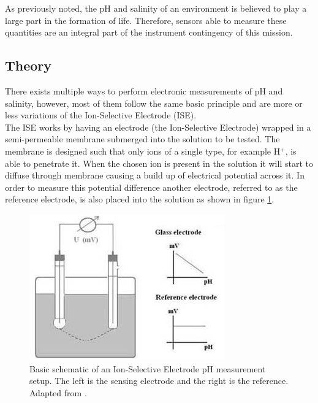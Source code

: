 
As previously noted, the pH and salinity of an environment is believed to play a large part in the formation of life. Therefore, sensors able to measure these quantities are an integral part of the instrument contingency of this mission. 

\subsection{Theory}
There exists multiple ways to perform electronic measurements of pH and salinity, however, most of them follow the same basic principle and are more or less variations of the Ion-Selective Electrode (ISE).\\

\noindent
The ISE works by having an electrode (the Ion-Selective Electrode) wrapped in a semi-permeable membrane submerged into the solution to be tested. The membrane is designed such that only ions of a single type, for example H$^+$, is able to penetrate it. When the chosen ion is present in the solution it will start to diffuse through membrane causing a build up of electrical potential across it. In order to measure this potential difference another electrode, referred to as the reference electrode, is also placed into the solution as shown in figure \ref{fig:iseSchematic}. \\

\begin{figure}[htb]
	\centering
	\includegraphics[width=.6\textwidth]{figures/LAMC/iseSchematic}
	\caption{Basic schematic of an Ion-Selective Electrode pH measurement setup. The left is the sensing electrode and the right is the reference. Adapted from \cite{website:ph2}.}
	\label{fig:iseSchematic}
\end{figure}


